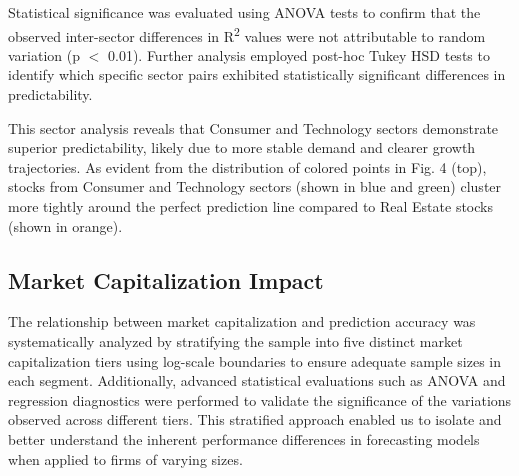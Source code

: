 \documentclass[3p,times,procedia]{elsarticle}
\begin{document}
\begin{table}[!ht]
\centering
\caption{\textbf{Sector-wise Average Performance Metrics}}
\end{table}




Statistical significance was evaluated using ANOVA tests to confirm that the observed inter-sector differences in R\textsuperscript{2} values were not attributable to random variation (p $<$ 0.01). Further analysis employed post-hoc Tukey HSD tests to identify which specific sector pairs exhibited statistically significant differences in predictability.

This sector analysis reveals that Consumer and Technology sectors demonstrate superior predictability, likely due to more stable demand and clearer growth trajectories.
As evident from the distribution of colored points in Fig. 4 (top), stocks from Consumer and Technology sectors (shown in blue and green) cluster more tightly around the perfect prediction line compared to Real Estate stocks (shown in orange).

\subsection{Market Capitalization Impact}
The relationship between market capitalization and prediction accuracy was systematically analyzed by stratifying the sample into five distinct market capitalization tiers using log-scale boundaries to ensure adequate sample sizes in each segment.
Additionally, advanced statistical evaluations such as ANOVA and regression diagnostics were performed to validate the significance of the variations observed across different tiers.
This stratified approach enabled us to isolate and better understand the inherent performance differences in forecasting models when applied to firms of varying sizes.
\end{document}
